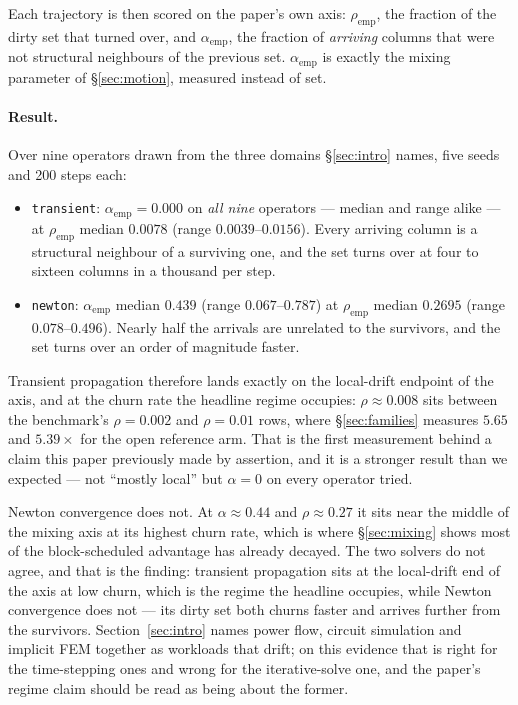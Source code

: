 \documentclass{article}
\begin{document}
Each trajectory is then scored on the paper's own axis: $\rho_{\text{emp}}$, the
fraction of the dirty set that turned over, and $\alpha_{\text{emp}}$, the
fraction of \emph{arriving} columns that were not structural neighbours of the
previous set. $\alpha_{\text{emp}}$ is exactly the mixing parameter of
\S\ref{sec:motion}, measured instead of set.

\paragraph{Result.} Over nine operators drawn from the three domains
\S\ref{sec:intro} names, five seeds and 200 steps each:

\begin{itemize}\itemsep2pt
  \item \texttt{transient}: $\alpha_{\text{emp}} = 0.000$ on \emph{all nine}
    operators --- median and range alike --- at $\rho_{\text{emp}}$ median
    $0.0078$ (range $0.0039$--$0.0156$). Every arriving column is a structural
    neighbour of a surviving one, and the set turns over at four to sixteen
    columns in a thousand per step.
  \item \texttt{newton}: $\alpha_{\text{emp}}$ median $0.439$ (range
    $0.067$--$0.787$) at $\rho_{\text{emp}}$ median $0.2695$ (range
    $0.078$--$0.496$). Nearly half the arrivals are unrelated to the survivors,
    and the set turns over an order of magnitude faster.
\end{itemize}

Transient propagation therefore lands exactly on the local-drift endpoint of the
axis, and at the churn rate the headline regime occupies: $\rho \approx 0.008$
sits between the benchmark's $\rho{=}0.002$ and $\rho{=}0.01$ rows, where
\S\ref{sec:families} measures $5.65$ and $5.39\times$ for the open reference arm. That is the first
measurement behind a claim this paper previously made by assertion, and it is a
stronger result than we expected --- not ``mostly local'' but $\alpha = 0$ on every
operator tried.

Newton convergence does not. At $\alpha \approx 0.44$ and $\rho \approx 0.27$ it
sits near the middle of the mixing axis at its highest churn rate, which is
where \S\ref{sec:mixing} shows most of the block-scheduled advantage has already
decayed. The two solvers do not agree, and that is the finding: transient propagation sits at the local-drift end of the axis at low
churn, which is the regime the headline occupies, while Newton convergence does
not --- its dirty set both churns faster and arrives further from the survivors.
Section~\ref{sec:intro} names power flow, circuit simulation and implicit FEM
together as workloads that drift; on this evidence that is right for the
time-stepping ones and wrong for the iterative-solve one, and the paper's regime
claim should be read as being about the former.
\end{document}

